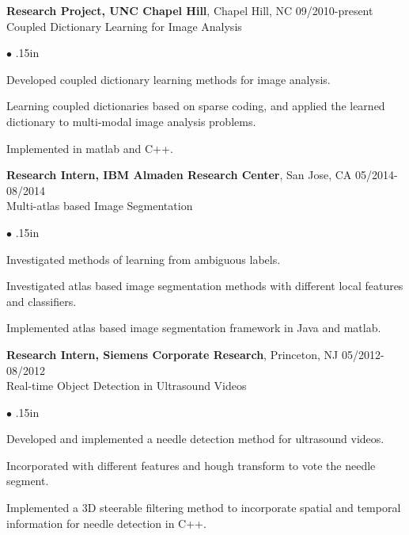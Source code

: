 \documentclass[line,margin]{res}
\newenvironment{bullets}{\begin{list}{\tiny$\bullet$}{\topsep 0pt \itemsep -2pt \leftmargin .15in}}{\vspace*{4pt}\end{list}}
\begin{document}
\begin{resume}
\textbf{Research Project, UNC Chapel Hill}, Chapel Hill, NC  \hfill      09/2010-present \\
Coupled Dictionary Learning for Image Analysis %
\begin{bullets}
	\item Developed coupled dictionary learning methods for image analysis.
	\item Learning coupled dictionaries based on sparse coding, and applied the learned dictionary to multi-modal image analysis problems.
	\item Implemented in matlab and C++.
\end{bullets}
\vspace{-.1in}


\textbf{Research Intern, IBM Almaden Research Center}, San Jose, CA \hfill      05/2014-08/2014 \\
Multi-atlas based Image Segmentation
\begin{bullets} 
\item Investigated methods of learning from ambiguous labels.
\item Investigated atlas based image segmentation methods with different local features and classifiers.
\item Implemented atlas based image segmentation framework in Java and matlab.
\end{bullets}
\vspace{-.1in}

\textbf{Research Intern, Siemens Corporate Research}, Princeton, NJ \hfill      05/2012-08/2012 \\
Real-time Object Detection in Ultrasound Videos
\begin{bullets} 
\item Developed and implemented a needle detection method for ultrasound videos. 
\item Incorporated with different features and hough transform to vote the needle segment.
\item Implemented a 3D steerable filtering method to incorporate spatial and temporal information for needle detection in C++.


\end{bullets}
\end{resume}
\end{document}
